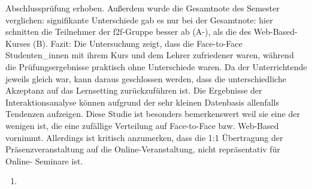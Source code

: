 Abschlussprüfung erhoben. Außerdem wurde die Gesamtnote des Semester
verglichen: signifikante Unterschiede gab es nur bei der Gesamtnote:
hier schnitten die Teilnehmer der f2f-Gruppe besser ab (A-), als die des
Web-Based-Kurses (B). Fazit: Die Untersuchung zeigt, dass die
Face-to-Face Studenten\_innen mit ihrem Kurs und dem Lehrer zufriedener
waren, während die Prüfungsergebnisse praktisch ohne Unterschiede waren.
Da der Unterrichtende jeweils gleich war, kann daraus geschlossen
werden, dass die unterschiedliche Akzeptanz auf das Lernsetting
zurückzuführen ist. Die Ergebnisse der Interaktionsanalyse können
aufgrund der sehr kleinen Datenbasis allenfalls Tendenzen aufzeigen.
Diese Studie ist besonders bemerkenswert weil sie eine der wenigen ist,
die eine zufällige Verteilung auf Face-to-Face bzw. Web-Based vornimmt.
Allerdings ist kritisch anzumerken, dass die 1:1 Übertragung der
Präsenzveranstaltung auf die Online-Veranstaltung, nicht repräsentativ
für Online- Seminare ist.

\begin{enumerate}
\def\labelenumi{\arabic{enumi}.}
\setcounter{enumi}{4}
\itemsep1pt\parskip0pt
\item
  \textbf{}
\end{enumerate}

